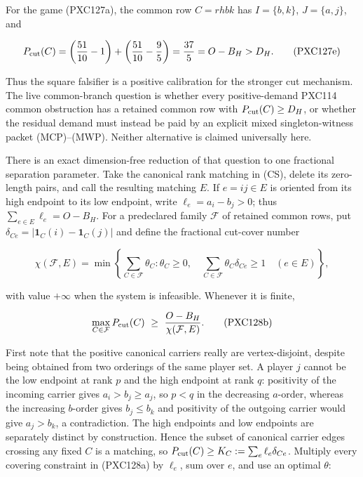 \documentclass[11pt]{article}
\newcommand{\one}{\mathbf 1}
\begin{document}
For the game (PXC127a), the common row $C=rhbk$ has
$I=\{b,k\}$, $J=\{a,j\}$, and

\begin{equation}
 P_{\rm cut}(C)=
 \left(\frac{51}{10}-1\right)
 +\left(\frac{51}{10}-\frac95\right)
 =\frac{37}{5}=O-B_H>D_H.                           \tag{PXC127e}
\end{equation}

Thus the square falsifier is a positive calibration for the stronger cut
mechanism.  The live common-branch question is whether every positive-demand
PXC114 common obstruction has a retained common row with
$P_{\rm cut}(C)\ge D_H$, or whether the residual demand must instead be
paid by an explicit mixed singleton-witness packet (MCP)--(MWP).  Neither
alternative is claimed universally here.

There is an exact dimension-free reduction of that question to one
fractional separation parameter.  Take the canonical rank matching in (CS),
delete its zero-length pairs, and call the resulting matching $E$.  If
$e=ij\in E$ is oriented from its high endpoint to its low endpoint, write
$\ell_e=a_i-b_j>0$; thus
$\sum_{e\in E}\ell_e=O-B_H$.  For a predeclared family $\mathcal F$ of
retained common rows, put
$\delta_{Ce}=|\one_C(i)-\one_C(j)|$ and define the fractional cut-cover
number

\begin{equation}
 \chi(\mathcal F,E)=
 \min\left\{\sum_{C\in\mathcal F}\theta_C:
       \theta_C\ge0,\quad
       \sum_{C\in\mathcal F}\theta_C\delta_{Ce}\ge1
       \quad(e\in E)\right\},                       \tag{PXC128a}
\end{equation}

with value $+\infty$ when the system is infeasible.  Whenever it is finite,

\begin{equation}
 \max_{C\in\mathcal F}P_{\rm cut}(C)
 \ \ge\ \frac{O-B_H}{\chi(\mathcal F,E)}.           \tag{PXC128b}
\end{equation}

First note that the positive canonical carriers really are vertex-disjoint,
despite being obtained from two orderings of the same player set.  A player
$j$ cannot be the low endpoint at rank $p$ and the high endpoint at rank
$q$: positivity of the incoming carrier gives
$a_i>b_j\ge a_j$, so $p<q$ in the decreasing $a$-order, whereas the
increasing $b$-order gives $b_j\le b_k$ and positivity of the outgoing
carrier would give $a_j>b_k$, a contradiction.  The high endpoints and low
endpoints are separately distinct by construction.  Hence the subset of
canonical carrier edges crossing any fixed $C$ is a
matching, so
$P_{\rm cut}(C)\ge K_C:=\sum_e\ell_e\delta_{Ce}$.  Multiply every covering
constraint in (PXC128a) by $\ell_e$, sum over $e$, and use an optimal
$\theta$:
\end{document}
